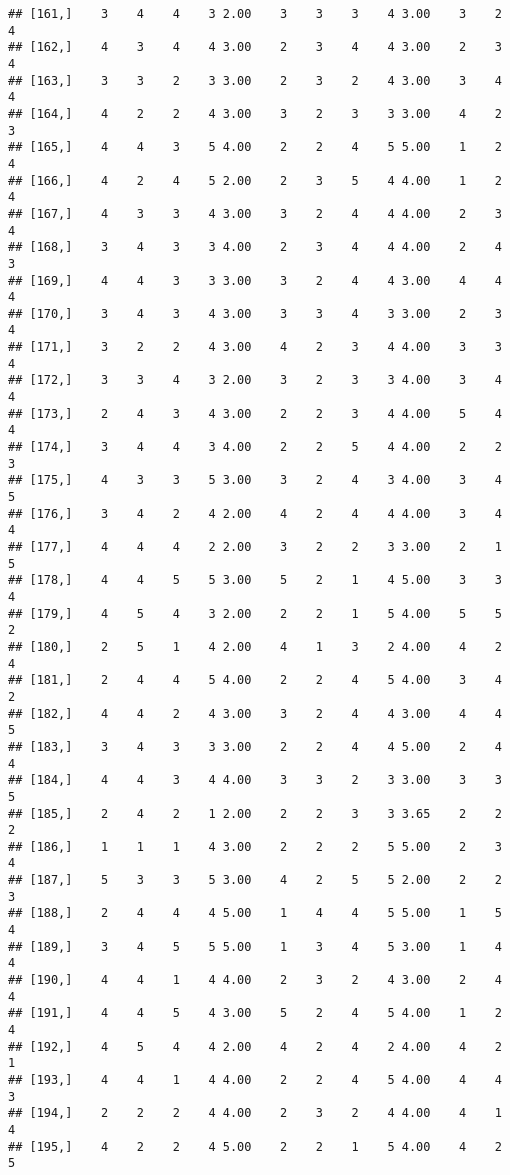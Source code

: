 \documentclass[]{article}
\begin{document}
\begin{verbatim}
## [161,]    3    4    4    3 2.00    3    3    3    4 3.00    3    2    4
## [162,]    4    3    4    4 3.00    2    3    4    4 3.00    2    3    4
## [163,]    3    3    2    3 3.00    2    3    2    4 3.00    3    4    4
## [164,]    4    2    2    4 3.00    3    2    3    3 3.00    4    2    3
## [165,]    4    4    3    5 4.00    2    2    4    5 5.00    1    2    4
## [166,]    4    2    4    5 2.00    2    3    5    4 4.00    1    2    4
## [167,]    4    3    3    4 3.00    3    2    4    4 4.00    2    3    4
## [168,]    3    4    3    3 4.00    2    3    4    4 4.00    2    4    3
## [169,]    4    4    3    3 3.00    3    2    4    4 3.00    4    4    4
## [170,]    3    4    3    4 3.00    3    3    4    3 3.00    2    3    4
## [171,]    3    2    2    4 3.00    4    2    3    4 4.00    3    3    4
## [172,]    3    3    4    3 2.00    3    2    3    3 4.00    3    4    4
## [173,]    2    4    3    4 3.00    2    2    3    4 4.00    5    4    4
## [174,]    3    4    4    3 4.00    2    2    5    4 4.00    2    2    3
## [175,]    4    3    3    5 3.00    3    2    4    3 4.00    3    4    5
## [176,]    3    4    2    4 2.00    4    2    4    4 4.00    3    4    4
## [177,]    4    4    4    2 2.00    3    2    2    3 3.00    2    1    5
## [178,]    4    4    5    5 3.00    5    2    1    4 5.00    3    3    4
## [179,]    4    5    4    3 2.00    2    2    1    5 4.00    5    5    2
## [180,]    2    5    1    4 2.00    4    1    3    2 4.00    4    2    4
## [181,]    2    4    4    5 4.00    2    2    4    5 4.00    3    4    2
## [182,]    4    4    2    4 3.00    3    2    4    4 3.00    4    4    5
## [183,]    3    4    3    3 3.00    2    2    4    4 5.00    2    4    4
## [184,]    4    4    3    4 4.00    3    3    2    3 3.00    3    3    5
## [185,]    2    4    2    1 2.00    2    2    3    3 3.65    2    2    2
## [186,]    1    1    1    4 3.00    2    2    2    5 5.00    2    3    4
## [187,]    5    3    3    5 3.00    4    2    5    5 2.00    2    2    3
## [188,]    2    4    4    4 5.00    1    4    4    5 5.00    1    5    4
## [189,]    3    4    5    5 5.00    1    3    4    5 3.00    1    4    4
## [190,]    4    4    1    4 4.00    2    3    2    4 3.00    2    4    4
## [191,]    4    4    5    4 3.00    5    2    4    5 4.00    1    2    4
## [192,]    4    5    4    4 2.00    4    2    4    2 4.00    4    2    1
## [193,]    4    4    1    4 4.00    2    2    4    5 4.00    4    4    3
## [194,]    2    2    2    4 4.00    2    3    2    4 4.00    4    1    4
## [195,]    4    2    2    4 5.00    2    2    1    5 4.00    4    2    5

\end{verbatim}
\end{document}
